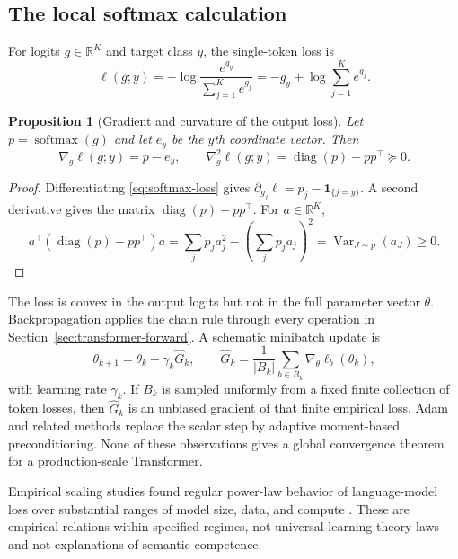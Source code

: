 \documentclass[11pt]{amsart}
\numberwithin{equation}{section}
\theoremstyle{definition}
\theoremstyle{plain}
\newtheorem{proposition}[definition]{Proposition}
\theoremstyle{remark}
\newcommand{\R}{\mathbb{R}}
\newcommand{\one}{\mathbf{1}}
\DeclareMathOperator{\softmax}{softmax}
\begin{document}
\subsection{The local softmax calculation}

For logits $g\in\R^K$ and target class $y$, the single-token loss is
\begin{equation}\label{eq:softmax-loss}
 \ell(g;y)
 =-\log\frac{e^{g_y}}{\sum_{j=1}^K e^{g_j}}
 =-g_y+\log\sum_{j=1}^K e^{g_j}.
\end{equation}

\begin{proposition}[Gradient and curvature of the output loss]
\label{prop:softmax-gradient}
Let $p=\softmax(g)$ and let $e_y$ be the $y$th coordinate vector.  Then
\begin{equation}\label{eq:softmax-gradient}
 \nabla_g\ell(g;y)=p-e_y,
 \qquad
 \nabla_g^2\ell(g;y)=\operatorname{diag}(p)-pp^\top\succeq0.
\end{equation}
\end{proposition}

\begin{proof}
Differentiating \eqref{eq:softmax-loss} gives
$\partial_{g_j}\ell=p_j-\one_{\{j=y\}}$.  A second derivative gives the
matrix $\operatorname{diag}(p)-pp^\top$.  For $a\in\R^K$,
\[
 a^\top(\operatorname{diag}(p)-pp^\top)a
 =\sum_jp_ja_j^2-\left(\sum_jp_ja_j\right)^2
 =\operatorname{Var}_{J\sim p}(a_J)\ge0.
\]
\end{proof}

The loss is convex in the output logits but not in the full parameter vector
$\theta$.  Backpropagation applies the chain rule through every operation in
Section~\ref{sec:transformer-forward}.  A schematic minibatch update is
\begin{equation}\label{eq:sgd-update}
 \theta_{k+1}
 =\theta_k-\gamma_k\widehat G_k,
 \qquad
 \widehat G_k
 =\frac1{|B_k|}\sum_{b\in B_k}\nabla_\theta\ell_b(\theta_k),
\end{equation}
with learning rate $\gamma_k$.  If $B_k$ is sampled uniformly from a fixed
finite collection of token losses, then $\widehat G_k$ is an unbiased gradient
of that finite empirical loss.  Adam and related methods replace the scalar
step by adaptive moment-based preconditioning.  None of these observations
gives a global convergence theorem for a production-scale Transformer.

Empirical scaling studies found regular power-law behavior of language-model
loss over substantial ranges of model size, data, and compute
\cite{KaplanEtAl2020,HoffmannEtAl2022}.  These are empirical relations within
specified regimes, not universal learning-theory laws and not explanations of
semantic competence.
\end{document}
